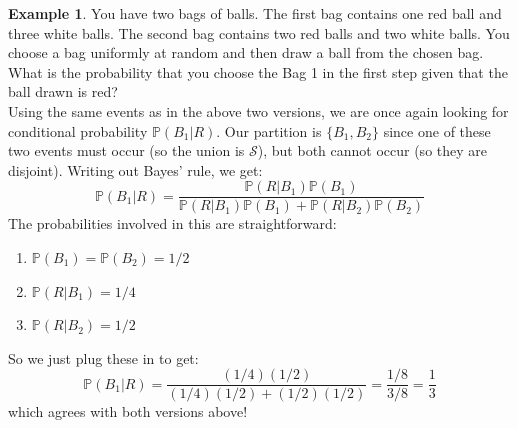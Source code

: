 \documentclass[12pt]{article}
\theoremstyle{definition}
\newtheorem*{example}{Example}
\theoremstyle{remark}
\def\P{{\mathbb P}}
\def\cals{{\mathcal S}}
\begin{document}
\begin{example}You have two bags of balls. The first bag contains one red ball and three white balls. The second bag contains two red balls and two white balls. You choose a bag uniformly at random and then draw a ball from the chosen bag. What is the probability that you choose the Bag 1 in the first step given that the ball drawn is red?\\

Using the same events as in the above two versions, we are once again looking for conditional probability $\P(B_1|R)$. Our partition is $\{B_1, B_2\}$ since one of these two events must occur (so the union is $\cals$), but both cannot occur (so they are disjoint). Writing out Bayes' rule, we get:
\[
\P(B_1|R) = \frac{ \P(R|B_1)\P(B_1)}{ \P(R|B_1)\P(B_1) + \P(R|B_2)\P(B_2) }
\]
The probabilities involved in this are straightforward:
\begin{enumerate}
\item $\P(B_1) = \P(B_2) = 1/2$
\item $\P(R|B_1) = 1/4$
\item $\P(R|B_2) = 1/2$
\end{enumerate}
So we just plug these in to get:
\[
\P(B_1|R) = \frac{ (1/4)(1/2)}{(1/4)(1/2) + (1/2)(1/2) } = \frac{1/8}{3/8} = \frac{1}{3}
\]
which agrees with both versions above!
\end{example}
\end{document}
